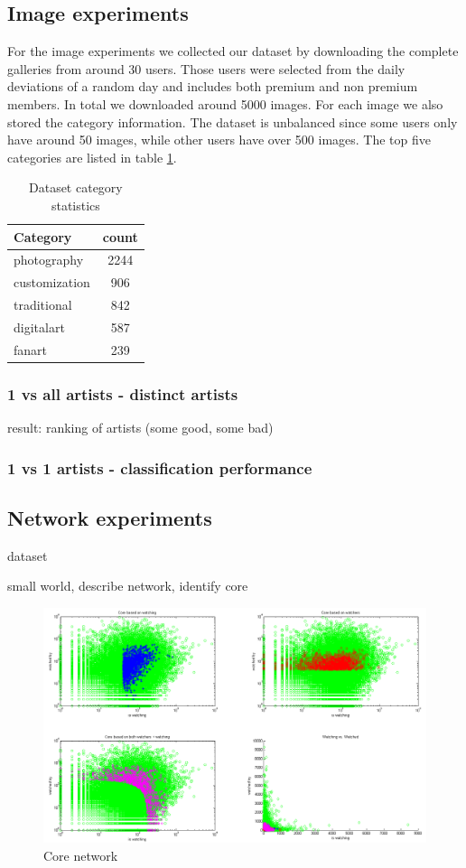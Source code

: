 \subsection{Image experiments}
For the image experiments we collected our dataset by downloading the complete galleries from around 30 users.
Those users were selected from the daily deviations of a random day and includes both premium and non premium members.
In total we downloaded around 5000 images. 
For each image we also stored the category information.
The dataset is unbalanced since some users only have around 50 images, while other users have over 500 images.
The top five categories are listed in table \ref{datasetstats}.

\begin{table}
    \centering
    \begin{tabular}
        { | l | c | } 
        \hline
        Category & count \\
        \hline
        photography & 2244 \\ 
        customization & 906 \\ 
        traditional & 842 \\ 
        digitalart & 587 \\ 
        fanart & 239 \\ 
        \hline 
    \end{tabular}
    \caption{Dataset category statistics}
    \label{datasetstats}
\end{table}

\subsubsection{1 vs all artists - distinct artists}
result: ranking of artists (some good, some bad)

\subsubsection{1 vs 1 artists - classification performance}

\subsection{Network experiments}
dataset

small world, describe network, identify core

\begin{figure}[htb]
  \centering
  \includegraphics[width=1\linewidth]{img/core.png}
  \caption{Core network}
  \label{fig:results_core}
\end{figure}